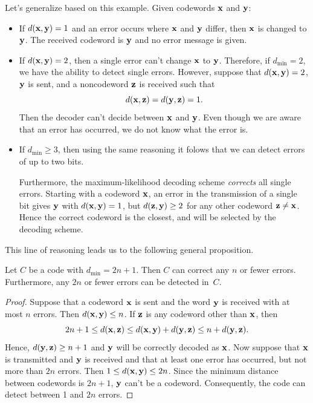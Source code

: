Let's generalize based on this example. Given codewords ${\bold x}$ and ${\bold y}$:
\begin{itemize}
\item
 If
$d({\bold x}, {\bold y}) = 1$ and an error occurs where ${\bold x}$
and ${\bold y}$ differ, then ${\bold x}$ is changed to ${\bold y}$.
The received codeword is ${\bold y}$ and no error message is given.
\item
If $d({\bold x}, {\bold y}) = 2$, then a single error can't
change ${\bold x}$ to ${\bold y}$. Therefore, if $d_{\min} = 2$, we
have the ability to detect single errors. However, suppose that
$d({\bold x}, {\bold y}) = 2$, ${\bold y}$ is sent, and a noncodeword
${\bold z}$ is received such that
\[
d({\bold x}, {\bold z}) = d({\bold y}, {\bold z}) = 1.
\]
Then the decoder can't decide between ${\bold x}$ and ${\bold y}$. Even
though we are aware that an error has occurred, we do not know what
the error is.
\item 
If $d_{\min} \geq 3$, then using the same reasoning it folows that we can detect errors of up to two bits. 

Furthermore, the maximum-likelihood decoding scheme 
\emph{corrects} all single errors. Starting with a codeword ${\bold x}$, an
error in the transmission of a single bit gives ${\bold y}$ with
$d({\bold x}, {\bold y}) = 1$, but $d({\bold z}, {\bold y}) \geq 2$
for any other codeword ${\bold z} \neq {\bold x}$. Hence the correct codeword is the closest, and will be selected by the decoding scheme.
 \end{itemize}
 
 This line of reasoning leads us to the following general proposition.
 
\begin{prop}{}
Let $C$ be a code with $d_{\min} = 2n + 1$. Then $C$ can correct any
$n$ or fewer errors.  Furthermore, any $2n$ or fewer errors can be
detected in~$C$. 
\end{prop}
  
\begin{proof}
Suppose that a codeword ${\bold x}$ is sent and the word ${\bold y}$
is received with at most $n$ errors. Then $d( {\bold x}, {\bold y})
\leq n$. If ${\bold z}$ is any codeword other than ${\bold x}$, then
\[
2n+1
\leq
d( {\bold x}, {\bold z})
\leq
d( {\bold x}, {\bold y}) + d( {\bold y}, {\bold z})
\leq
n + d( {\bold y}, {\bold z}).
\]
Hence, $d({\bold y}, {\bold z} ) \geq n+1$ and ${\bold y}$ will be
correctly decoded as ${\bold x}$. Now suppose that ${\bold x}$ is
transmitted and ${\bold y}$ is received and that at least one error 
has occurred, but not more than $2n$ errors. Then $1 \leq d( {\bold x},
{\bold y} ) \leq 2n$.  Since the minimum distance between codewords is
$2n +1$, ${\bold y}$ can't be a codeword.  Consequently, the code can
detect between 1 and $2n$ errors. 
\end{proof}
 
